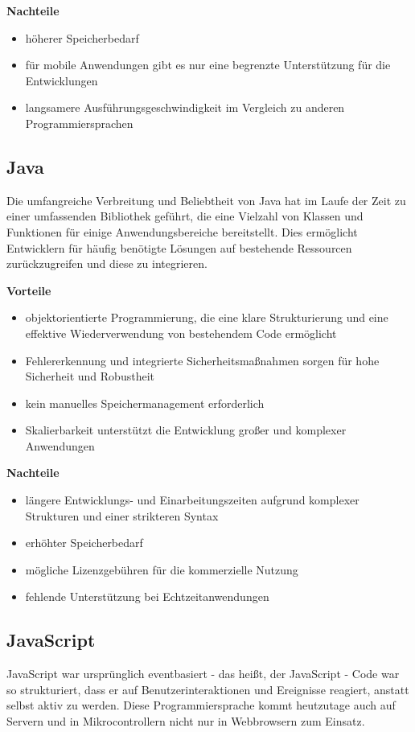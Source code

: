 \textbf{Nachteile}
\begin{itemize}
	\item höherer Speicherbedarf
	\item für mobile Anwendungen gibt es nur eine begrenzte Unterstützung für die Entwicklungen
	\item langsamere Ausführungsgeschwindigkeit im Vergleich zu anderen Programmiersprachen
\end{itemize}

\subsection{Java}
Die umfangreiche Verbreitung und Beliebtheit von Java hat im Laufe der Zeit zu einer umfassenden Bibliothek geführt, die eine Vielzahl von Klassen und Funktionen für einige Anwendungsbereiche bereitstellt. Dies ermöglicht Entwicklern für häufig benötigte Lösungen auf bestehende Ressourcen zurückzugreifen und diese zu integrieren. \parencite{Programmiersprachen}

\textbf{Vorteile}
\begin{itemize}
	\item objektorientierte Programmierung, die eine klare Strukturierung und eine effektive Wiederverwendung von bestehendem Code ermöglicht
	\item Fehlererkennung und integrierte Sicherheitsmaßnahmen sorgen für hohe Sicherheit und Robustheit
	\item kein manuelles Speichermanagement erforderlich
	\item Skalierbarkeit unterstützt die Entwicklung großer und komplexer Anwendungen
\end{itemize}

\textbf{Nachteile}
\begin{itemize}
	\item längere Entwicklungs- und Einarbeitungszeiten aufgrund komplexer Strukturen und einer strikteren Syntax
	\item erhöhter Speicherbedarf
	\item mögliche Lizenzgebühren für die kommerzielle Nutzung
	\item fehlende Unterstützung bei Echtzeitanwendungen
\end{itemize}

\subsection{JavaScript}
JavaScript war ursprünglich eventbasiert - das heißt, der JavaScript - Code war so strukturiert, dass er auf Benutzerinteraktionen und Ereignisse reagiert, anstatt selbst aktiv zu werden. Diese Programmiersprache kommt heutzutage auch auf Servern und in Mikrocontrollern nicht nur in Webbrowsern zum Einsatz. \parencite{Programmiersprachen}

